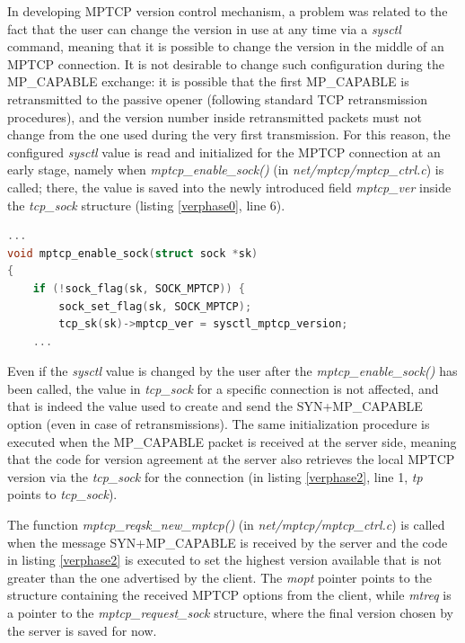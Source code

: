 In developing MPTCP version control mechanism, a problem was related to the fact that the user can change the version in use at any time via a \textit{sysctl} command, meaning that it is possible to change the version in the middle of an MPTCP connection. It is not desirable to change such configuration during the MP\_CAPABLE exchange: it is possible that the first MP\_CAPABLE is retransmitted to the passive opener (following standard TCP retransmission procedures), and the version number inside retransmitted packets must not change from the one used during the very first transmission. For this reason, the configured \textit{sysctl} value is read and initialized for the MPTCP connection at an early stage, namely when \textit{mptcp\_enable\_sock()} (in \textit{net/mptcp/mptcp\_ctrl.c}) is called; there, the value is saved into the newly introduced field \textit{mptcp\_ver} inside the \textit{tcp\_sock} structure (listing \ref{verphase0}, line 6).

\begin{lstlisting}[language=c, caption=MPTCP version agreement (initializing \textit{sysctl} value), label=verphase0]
...
void mptcp_enable_sock(struct sock *sk)
{
	if (!sock_flag(sk, SOCK_MPTCP)) {
		sock_set_flag(sk, SOCK_MPTCP);
		tcp_sk(sk)->mptcp_ver = sysctl_mptcp_version;
	...
\end{lstlisting}

Even if the \textit{sysctl} value is changed by the user after the \textit{mptcp\_enable\_sock()} has been called, the value in \textit{tcp\_sock} for a specific connection is not affected, and that is indeed the value used to create and send the SYN+MP\_CAPABLE option (even in case of retransmissions).
The same initialization procedure is executed when the MP\_CAPABLE packet is received at the server side, meaning that the code for version agreement at the server also retrieves the local MPTCP version via the \textit{tcp\_sock} for the connection (in listing \ref{verphase2}, line 1, \textit{tp} points to \textit{tcp\_sock}).

The function \textit{mptcp\_reqsk\_new\_mptcp()} (in \textit{net/mptcp/mptcp\_ctrl.c}) is called when the message SYN+MP\_CAPABLE is received by the server and the code in listing \ref{verphase2} is executed to set the highest version available that is not greater than the one advertised by the client. The \textit{mopt} pointer points to the structure containing the received MPTCP options from the client, while \textit{mtreq} is a pointer to the \textit{mptcp\_request\_sock} structure, where the final version chosen by the server is saved for now.

